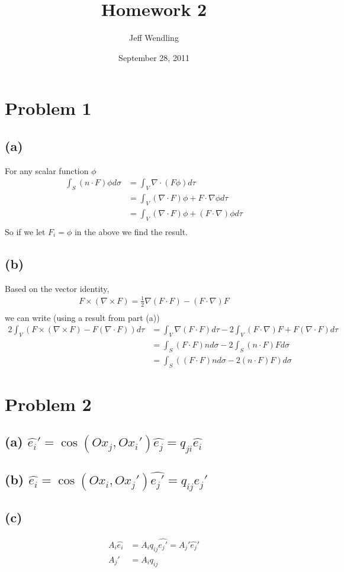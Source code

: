 \documentclass[12pt]{article}
\title{Homework 2}
\author{Jeff Wendling}
\date{September 28, 2011}
\newcommand{\eq}[1]{\begin{align*}#1\end{align*}}
\begin{document}
\maketitle
\section*{Problem 1}
\subsection*{(a)} For any scalar function $\phi$
\eq{
	\int_S (n\cdot F)\phi d\sigma &= \int_V \nabla \cdot(F \phi) d\tau\\
	&= \int_V (\nabla \cdot F)\phi + F\cdot\nabla\phi d\tau\\
	&= \int_V (\nabla\cdot F)\phi + (F\cdot\nabla)\phi d\tau\\
}
So if we let $F_i = \phi$ in the above we find the result.
\subsection*{(b)} Based on the vector identity,
\eq{
	F \times (\nabla \times F) = \frac{1}{2} \nabla (F \cdot F) - (F \cdot \nabla)F\\
}
we can write (using a result from part (a))
\eq{
	2 \int_V (F \times (\nabla \times F) - F(\nabla \cdot F))d\tau &= \int_V \nabla (F \cdot F) d\tau - 2\int_V (F \cdot \nabla)F + F(\nabla \cdot F) d\tau\\
	&= \int_S (F\cdot F)n d\sigma - 2\int_S (n\cdot F)F d\sigma\\
	&= \int_S ((F\cdot F)n d\sigma - 2(n\cdot F)F)d\sigma
}
\section*{Problem 2}
\subsection*{(a) $\hat{e_i}' = \cos(Ox_j, Ox_i')\hat{e_j} = q_{ji}\hat{e_i}$}
\subsection*{(b) $\hat{e_i} = \cos(Ox_i, Ox_j')\hat{e_j'} = q_{ij}\hat{e_j}'$}
\subsection*{(c)}
\eq{
	A_i\hat{e_i} &= A_i q_{ij}\hat{e_j'} = A_j'\hat{e_j}'\\
	A_j' &= A_iq_{ij}
}
\end{document}
